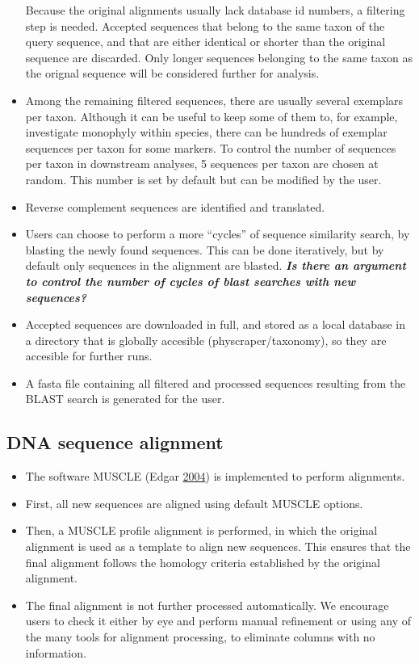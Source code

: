 \documentclass[]{article}
\providecommand{\tightlist}{%
  \setlength{\itemsep}{0pt}\setlength{\parskip}{0pt}}
\begin{document}
\begin{itemize}
  Because the original alignments usually lack database id numbers, a filtering
  step is needed. Accepted sequences that belong to the
  same taxon of the query sequence, and that are either identical or shorter than
  the original sequence are discarded. Only longer sequences belonging to the
  same taxon as the orignal sequence will be considered further for analysis.
\item
  Among the remaining filtered sequences, there are usually several exemplars per taxon.
  Although it can be useful to keep some of them to, for example, investigate monophyly
  within species, there can be hundreds of exemplar sequences per taxon for some markers.
  To control the number of sequences per taxon in downstream analyses,
  5 sequences per taxon are chosen at random. This number is set by default but can be modified by the user.
\item
  Reverse complement sequences are identified and translated.
\item
  Users can choose to perform a more ``cycles'' of sequence similarity search, by blasting the newly found sequences. This can be done iteratively, but by default only sequences in the alignment are blasted. \textbf{\emph{Is there an argument to control the number of cycles of blast searches with new sequences?}}
\item
  Accepted sequences are downloaded in full, and stored as a local database in a directory that is globally accesible (physcraper/taxonomy), so they are accesible for further runs.
\item
  A fasta file containing all filtered and processed sequences resulting from the BLAST search is generated for the user.
\end{itemize}

\hypertarget{dna-sequence-alignment}{%
\subsection{DNA sequence alignment}\label{dna-sequence-alignment}}

\begin{itemize}
\tightlist
\item
  The software MUSCLE (Edgar \protect\hyperlink{ref-edgar2004muscle}{2004}) is implemented to perform alignments.
\item
  First, all new sequences are aligned using default MUSCLE options.
\item
  Then, a MUSCLE profile alignment is performed, in which the original alignment
  is used as a template to align new sequences. This ensures that the final alignment
  follows the homology criteria established by the original alignment.
\item
  The final alignment is not further processed automatically. We encourage users
  to check it either by eye and perform manual refinement or using any of the many
  tools for alignment processing, to eliminate columns with no information.
\end{itemize}
\end{document}
